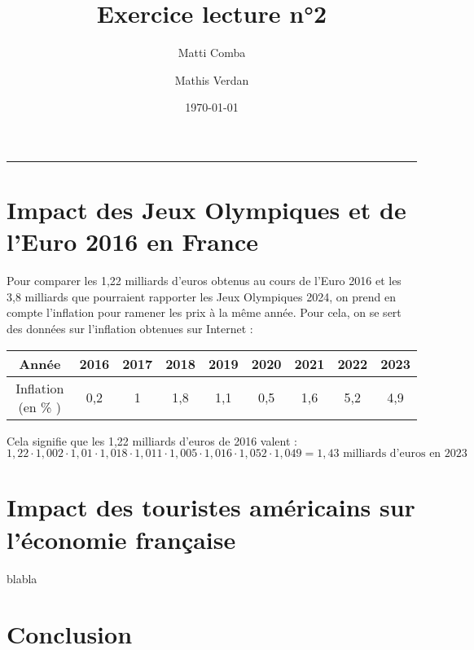 \documentclass{article}
\title{Exercice lecture n°2}
\author{Matti Comba \and Mathis Verdan}
\date{\today}
\begin{document}
\maketitle
\begin{center}
  \rule{\linewidth}{0.5mm}
\end{center}


\section{Impact des Jeux Olympiques et de l'Euro 2016 en France}
Pour comparer les 1,22 milliards d'euros obtenus au cours de l'Euro 2016 et les 3,8 milliards que pourraient rapporter les Jeux Olympiques 2024, on prend en compte l'inflation pour ramener les prix à la même année. Pour cela, on se sert des données sur l'inflation obtenues sur Internet : 

\begin{center}
    \begin{tabular}{ | c | c | c |  c |  c |  c |  c |  c |  c | }
      \hline
      Année & 2016 & 2017 & 2018 & 2019 & 2020 & 2021 & 2022 & 2023 \\ \hline
      Inflation (en \% ) & 0,2 & 1 & 1,8 & 1,1 & 0,5 & 1,6 & 5,2 & 4,9 \\ \hline
    \end{tabular}
\end{center}

Cela signifie que les 1,22 milliards d'euros de 2016 valent :
$$ 1,22 \cdot 1,002 \cdot 1,01 \cdot 1,018 \cdot 1,011 \cdot 1,005 \cdot 1,016 \cdot 1,052 \cdot 1,049 = 1,43 \text{ milliards d'euros en 2023}$$


\section{Impact des touristes américains sur l'économie française}
blabla
\section{Conclusion}
\end{document}

